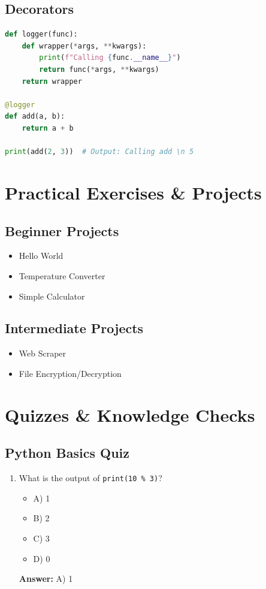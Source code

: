 \documentclass{article}
\begin{document}
\subsection{Decorators}

\begin{lstlisting}[language=Python]
def logger(func):
    def wrapper(*args, **kwargs):
        print(f"Calling {func.__name__}")
        return func(*args, **kwargs)
    return wrapper

@logger
def add(a, b):
    return a + b

print(add(2, 3))  # Output: Calling add \n 5
\end{lstlisting}

\section{Practical Exercises \& Projects}

\subsection{Beginner Projects}

\begin{itemize}
    \item Hello World
    \item Temperature Converter
    \item Simple Calculator
\end{itemize}

\subsection{Intermediate Projects}

\begin{itemize}
    \item Web Scraper
    \item File Encryption/Decryption
\end{itemize}

\section{Quizzes \& Knowledge Checks}

\subsection{Python Basics Quiz}

\begin{enumerate}
    \item What is the output of \texttt{print(10 \% 3)}?
    \begin{itemize}
        \item A) 1
        \item B) 2
        \item C) 3
        \item D) 0
    \end{itemize}
    \textbf{Answer:} A) 1
\end{enumerate}
\end{document}
